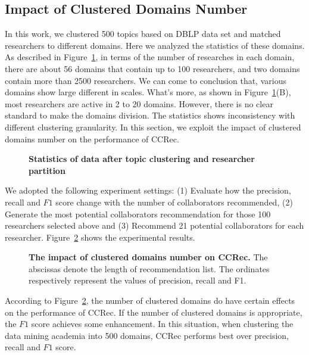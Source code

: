 \documentclass[10pt,letterpaper]{article}
\begin{document}
\subsection*{Impact of Clustered Domains Number}
In this work, we clustered 500 topics based on DBLP data set and matched researchers to different domains. Here we analyzed the statistics of these domains. As described in Figure~\ref{Fig. 5}, in terms of the number of researches in each domain, there are about 56 domains that contain up to 100 researchers, and two domains contain more than 2500 researchers. We can come to conclusion that, various domains show large different in scales. What's more, as shown in Figure~\ref{Fig. 5}(B), most researchers are active in 2 to 20 domains. However, there is no clear standard to make the domains division. The statistics shows inconsistency with different clustering granularity. In this section, we exploit the impact of clustered domains number on the performance of CCRec.

\begin{figure}[!hbt]
\caption{{\bf Statistics of data after topic clustering and researcher partition}}
\label{Fig. 5}
\end{figure}

We adopted the following experiment settings: (1) Evaluate how the precision, recall and $F1$ score change with the number of collaborators recommended, (2) Generate the most potential collaborators recommendation for those 100 researchers selected above and (3) Recommend 21 potential collaborators for each researcher. Figure~\ref{Fig. 6} shows the experimental results.

\begin{figure}[!hbt]
\caption{{\bf The impact of clustered domains number on CCRec.} The abscissas denote the length of recommendation list. The ordinates respectively represent the values of precision, recall and F1.}
\label{Fig. 6}
\end{figure}

According to Figure~\ref{Fig. 6}, the number of clustered domains do have certain effects on the performance of CCRec. If the number of clustered domains is appropriate, the $F1$ score achieves some enhancement. In this situation, when clustering the data mining academia into 500 domains, CCRec performs best over precision, recall and $F1$ score.
\end{document}
